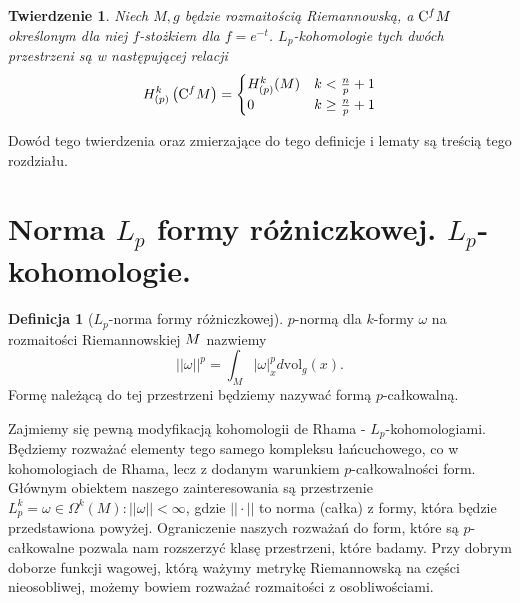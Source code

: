 \documentclass[licencjacka]{pracamgr}
\theoremstyle{definition}
\newtheorem{definition}{Definicja}[section]
\theoremstyle{definition}
\theoremstyle{plain}
\theoremstyle{plain}
\theoremstyle{plain}
\newtheorem{theorem}{Twierdzenie}[section]
\theoremstyle{plain}
\def\cfm{\ensuremath\mathrm{C}^fM}
\def\M{\ensuremath M}
\begin{document}
\begin{theorem}\label{main-theorem}
  Niech $M,g$ będzie rozmaitością Riemannowską, a $\cfm$ określonym dla niej
  $f$-stożkiem dla $f = e^{-t}$. $L_p$-kohomologie tych dwóch przestrzeni są
  w następującej relacji
  \begin{equation}
    H_{(p)}^k \left( \cfm \right) = \begin{cases}
      H_{(p)}^k(M) & k < \frac{n}{p} + 1 \\
      0 & k \geq  \frac{n}{p} + 1 \\
      \end{cases}
  \end{equation}
\end{theorem}

Dowód tego twierdzenia oraz zmierzające do tego definicje i lematy są treścią tego
rozdziału. \\

\section{Norma $L_p$ formy różniczkowej. $L_p$-kohomologie.}


\begin{definition}[$L_p$-norma formy różniczkowej]
$p$-normą dla $k$-formy $\omega$ na rozmaitości Riemannowskiej $\M$ nazwiemy
\begin{equation} \label{big-norm}
  || \omega ||^p =  \int_M |\omega|_x^p d \text{vol}_g(x).
\end{equation}
Formę należącą do tej przestrzeni będziemy nazywać formą $p$-całkowalną.
\end{definition}

Zajmiemy się pewną modyfikacją kohomologii de Rhama - $L_p$-kohomologiami.
Będziemy rozważać elementy tego samego kompleksu łańcuchowego, co w
kohomologiach de Rhama, lecz z dodanym warunkiem $p$-całkowalności form.
Głównym obiektem naszego zainteresowania są przestrzenie $L_p^k = {\omega \in
\Omega^k(M): ||\omega|| <\infty}$, gdzie $|| \cdot ||$ to norma (całka) z
formy, która będzie przedstawiona powyżej.  Ograniczenie naszych rozważań do
form, które są $p$-całkowalne pozwala nam rozszerzyć klasę przestrzeni, które
badamy. Przy dobrym doborze funkcji wagowej, którą ważymy metrykę Riemannowską
na części nieosobliwej, możemy bowiem rozważać rozmaitości z osobliwościami. \\
\end{document}
